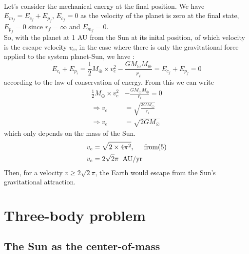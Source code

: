 \documentclass[a4paper, twoside, 11pt]{report}
\theoremstyle{theorem}
\theoremstyle{remark}
\theoremstyle{exemple}
\begin{document}
            \paragraph{}Let's consider the mechanical energy at the final position. We have $E_{m_f} = E_{c_f} + E_{p_f}$, $E_{c_f} = 0$ as the velocity of the planet is zero at the final state, $E_{p_f}=0$ since $r_f=\infty$ and $E_{m_f}=0$. \\
            So, with the planet at 1 AU from the Sun at its inital position, of which velocity is the escape velocity $v_e$, in the case where there is only the gravitational force applied to the system planet-Sun, we have :
                \begin{equation*}
                    E_{c_i} + E_{p_i} = \frac{1}{2}M_{\oplus} \times v_e^2 - \frac{GM_{\odot}M_{\oplus}}{r_i} = E_{c_f} + E_{p_f} = 0
                \end{equation*}
            according to the law of conservation of energy. From this we can write
                \begin{align*}
                    \frac{1}{2}M_{\oplus} \times v_e^2 &- \frac{GM_{\odot}M_{\oplus}}{r_i} = 0 \\
                    \Rightarrow v_e &= \sqrt{\frac{2GM_{\odot}}{r_i}} \\
                    \Rightarrow v_e &=\sqrt{2GM_{\odot}}
                \end{align*}
            which only depends on the mass of the Sun. 
                \begin{align*}
                    v_e &= \sqrt{2\times 4\pi^2}, \hspace{0.5cm} \mathrm{from (5)}\\
                    v_e &= 2\sqrt{2}\pi \hspace{0.2cm} \mathrm{AU/yr}
                \end{align*}
            Then, for a velocity $v \geq 2\sqrt{2}\pi$, the Earth would escape from the Sun's gravitational attraction. 
                        
                        
    
    \section{Three-body problem}
        \subsection{The Sun as the center-of-mass}   
        
\end{document}

